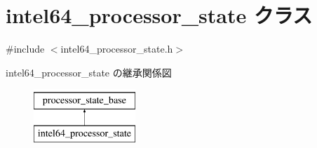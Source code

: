 \hypertarget{classintel64__processor__state}{}\section{intel64\+\_\+processor\+\_\+state クラス}
\label{classintel64__processor__state}


{\ttfamily \#include $<$intel64\+\_\+processor\+\_\+state.\+h$>$}

intel64\+\_\+processor\+\_\+state の継承関係図\begin{figure}[H]
\begin{center}
\leavevmode
\includegraphics[height=2.000000cm]{classintel64__processor__state}
\end{center}
\end{figure}
